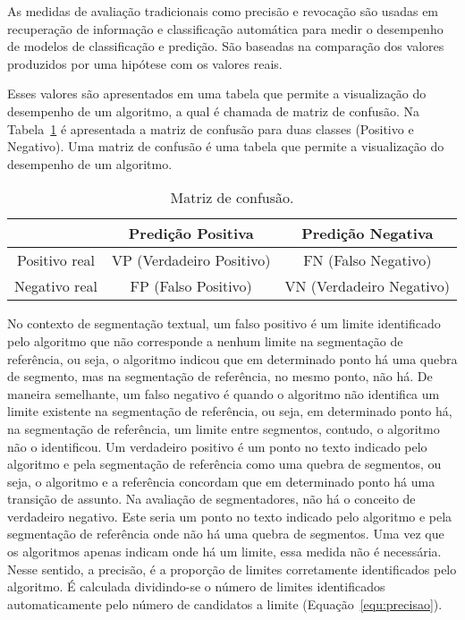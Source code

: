 


%
As medidas de avaliação tradicionais como precisão e revocação são usadas em recuperação de informação e classificação automática para medir o desempenho de modelos de classificação e predição. São baseadas na comparação dos valores produzidos por uma hipótese com os valores reais. 

Esses valores são apresentados em uma tabela que permite a visualização do desempenho de um algoritmo, a qual é chamada de matriz de confusão. Na Tabela~\ref{tab:matrizconfusao} é apresentada a matriz de confusão para duas classes (Positivo e Negativo). Uma matriz de confusão é uma tabela que permite a visualização do desempenho de um algoritmo. 

\begin{table}[!h]
	\centering
	
	\begin{tabular}{|c|c|c|}
		\hline
		                & Predição Positiva         & Predição Negativa        \\ \hline
		Positivo real   & VP (Verdadeiro Positivo)  & FN (Falso Negativo)      \\ \hline
		Negativo real   & FP (Falso Positivo)       & VN (Verdadeiro Negativo) \\ \hline
	
	\end{tabular}
	
	\caption{Matriz de confusão.}
	\label{tab:matrizconfusao}

\end{table}





No contexto de segmentação textual, um falso positivo é um limite identificado pelo algoritmo que não corresponde a nenhum limite na segmentação de referência, ou seja, o algoritmo indicou que em determinado ponto há uma quebra de segmento, mas na segmentação de referência, no mesmo ponto, não há. 
%
 De maneira semelhante, um falso negativo é quando o algoritmo não identifica um limite existente na segmentação de referência, ou seja, em determinado ponto há, na segmentação de referência, um limite entre segmentos, contudo, o algoritmo não o identificou.
%
%
 Um verdadeiro positivo é um ponto no texto indicado pelo algoritmo e pela segmentação de referência como uma quebra de segmentos, ou seja, o algoritmo e a referência concordam que em determinado ponto há uma transição de assunto.
%
%
 Na avaliação de segmentadores, não há o conceito de verdadeiro negativo. Este seria um ponto no texto indicado pelo algoritmo e pela segmentação de referência onde não há uma quebra de segmentos. Uma vez que os algoritmos apenas indicam onde há um limite, essa medida não é necessária. %
%
%
%
 Nesse sentido, a precisão, é a proporção de limites corretamente identificados pelo algoritmo. É calculada dividindo-se o número de limites identificados automaticamente pelo número de candidatos a limite (Equação~\ref{equ:precisao}).
 

